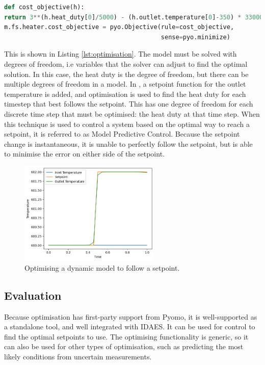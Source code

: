 \documentclass[12pt]{article}
\begin{document}
\begin{lstlisting}[language=Python,caption=Optimising the heater model in IDAES,label=lst:optimisation]
def cost_objective(h):
return 3**(h.heat_duty[0]/5000) - (h.outlet.temperature[0]-350) * 33000
m.fs.heater.cost_objective = pyo.Objective(rule=cost_objective, 
                                           sense=pyo.minimize)
\end{lstlisting}

This is shown in Listing \ref{lst:optimisation}. The model must be solved with degrees of freedom, i.e variables that the solver can adjust to find the optimal solution. In this case, the heat duty is the degree of freedom, but there can be multiple degrees of freedom in a model. 
In , a setpoint function for the outlet temperature is added, and optimisation is used to find the heat duty for each timestep that best follows the setpoint. This has one degree of freedom for each discrete time step that must be optimised: the heat duty at that time step. 
When this technique is used to control a system based on the optimal way to reach a setpoint, it is referred to as Model Predictive Control.
Because the setpoint change is instantaneous, it is unable to perfectly follow the setpoint, but is able to minimise the error on either side of the setpoint. 


\begin{figure}[h]
    \centering
    \includegraphics[width=0.6\textwidth]{dynamics_optimisation.png}
    \caption{Optimising a dynamic model to follow a setpoint.}
    \label{fig:optimisation_dynamics}
\end{figure}


\subsection{Evaluation}


Because optimisation has first-party support from Pyomo, it is well-supported as a standalone tool, and well integrated with IDAES.  It can be used for control to find the optimal setpoints to use. The optimising functionality is generic, so it can also be used for other types of optimisation, such as predicting the most likely conditions from uncertain measurements.
\end{document}
